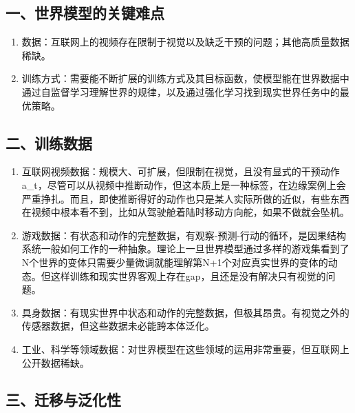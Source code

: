 \hypertarget{ux4e00ux4e16ux754cux6a21ux578bux7684ux5173ux952eux96beux70b9}{%
\subsection{一、世界模型的关键难点}\label{ux4e00ux4e16ux754cux6a21ux578bux7684ux5173ux952eux96beux70b9}}

\begin{enumerate}
\def\labelenumi{\arabic{enumi}.}
\item
  数据：互联网上的视频存在限制于视觉以及缺乏干预的问题；其他高质量数据稀缺。
\item
  训练方式：需要能不断扩展的训练方式及其目标函数，使模型能在世界数据中通过自监督学习理解世界的规律，以及通过强化学习找到现实世界任务中的最优策略。
\end{enumerate}

\hypertarget{ux4e8cux8badux7ec3ux6570ux636e}{%
\subsection{二、训练数据}\label{ux4e8cux8badux7ec3ux6570ux636e}}

\begin{enumerate}
\def\labelenumi{\arabic{enumi}.}
\item
  互联网视频数据：规模大、可扩展，但限制在视觉，且没有显式的干预动作a\_t，尽管可以从视频中推断动作，但这本质上是一种标签，在边缘案例上会严重挣扎。而且，即使推断得好的动作也只是某人实际所做的近似，有些东西在视频中根本看不到，比如从驾驶舱着陆时移动方向舵，如果不做就会坠机。
\item
  游戏数据：有状态和动作的完整数据，有观察-预测-行动的循环，是因果结构系统一般如何工作的一种抽象。理论上一旦世界模型通过多样的游戏集看到了N个世界的变体只需要少量微调就能理解第N+1个对应真实世界的变体的动态。但这样训练和现实世界客观上存在gap，且还是没有解决只有视觉的问题。
\item
  具身数据：有现实世界中状态和动作的完整数据，但极其昂贵。有视觉之外的传感器数据，但这些数据未必能跨本体泛化。
\item
  工业、科学等领域数据：对世界模型在这些领域的运用非常重要，但互联网上公开数据稀缺。
\end{enumerate}

\hypertarget{ux4e09ux8fc1ux79fbux4e0eux6cdbux5316ux6027}{%
\subsection{三、迁移与泛化性}\label{ux4e09ux8fc1ux79fbux4e0eux6cdbux5316ux6027}}

